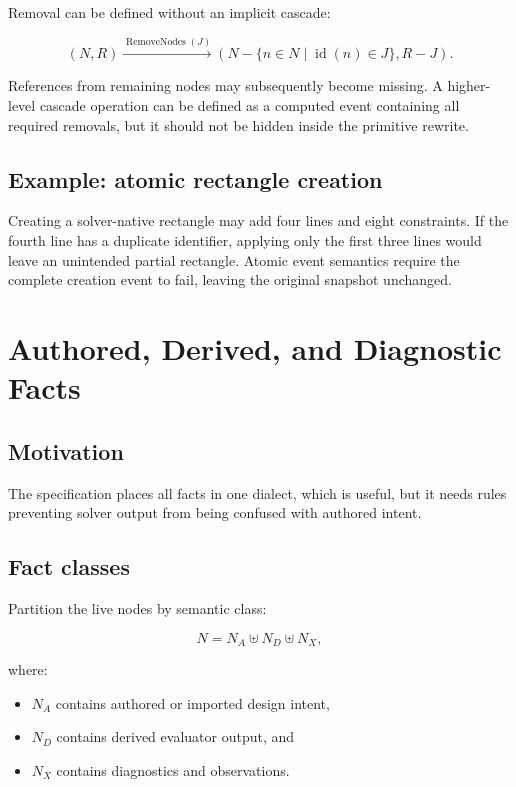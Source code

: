 \documentclass[11pt]{article}
\begin{document}
Removal can be defined without an implicit cascade:

\[
(N,R)\xrightarrow{\operatorname{RemoveNodes}(J)}
(N-\{n\in N\mid\operatorname{id}(n)\in J\},R-J).
\]

References from remaining nodes may subsequently become missing. A higher-level
cascade operation can be defined as a computed event containing all required
removals, but it should not be hidden inside the primitive rewrite.

\subsection{Example: atomic rectangle creation}

Creating a solver-native rectangle may add four lines and eight constraints.
If the fourth line has a duplicate identifier, applying only the first three
lines would leave an unintended partial rectangle. Atomic event semantics
require the complete creation event to fail, leaving the original snapshot
unchanged.

\section{Authored, Derived, and Diagnostic Facts}

\subsection{Motivation}

The specification places all facts in one dialect, which is useful, but it needs
rules preventing solver output from being confused with authored intent.

\subsection{Fact classes}

Partition the live nodes by semantic class:

\[
N=N_A\uplus N_D\uplus N_X,
\]

where:

\begin{itemize}
  \item $N_A$ contains authored or imported design intent,
  \item $N_D$ contains derived evaluator output, and
  \item $N_X$ contains diagnostics and observations.
\end{itemize}
\end{document}
